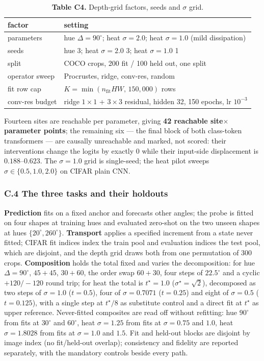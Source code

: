 \begin{table}[t]
\centering
\small
\caption*{\textbf{Table C4.} Depth-grid factors, seeds and $\sigma$ grid.}
\begin{tabularx}{\textwidth}{@{}>{\raggedright\arraybackslash}X >{\raggedright\arraybackslash}X@{}}
\toprule
\textbf{factor} & \textbf{setting} \\
\midrule
parameters & hue $\Delta=90^\circ$; heat $\sigma=2.0$; heat $\sigma=1.0$ (mild dissipation) \\
seeds & hue 3; heat $\sigma=2.0$ 3; heat $\sigma=1.0$ 1 \\
split & 300 COCO crops, 200 fit / 100 held out, one split \\
operator sweep & Procrustes, ridge, conv-res, random \\
fit row cap & $K=\min(n_{\text{fit}}HW,\allowbreak{}\,\allowbreak{}150{,\allowbreak{}}000)$ rows \\
conv-res budget & ridge $1\times1$ + $3\times3$ residual, hidden 32, 150 epochs, lr $10^{-3}$ \\
\bottomrule
\end{tabularx}
\end{table}

Fourteen sites are reachable per parameter, giving \textbf{42 reachable site$\times$parameter points}; the remaining six --- the final block of both class-token transformers --- are causally unreachable and marked, not scored: their interventions change the logits by exactly $0$ while their input-side displacement is $0.188$--$0.623$. The $\sigma=1.0$ grid is single-seed; the heat pilot sweeps $\sigma\in\{0.5,1.0,2.0\}$ on CIFAR plain CNN.

\subsubsection*{C.4 The three tasks and their holdouts}

\textbf{Prediction} fits on a fixed anchor and forecasts other angles; the probe is fitted on four shapes at training hues and evaluated zero-shot on the two unseen shapes at hues $\{20^\circ,260^\circ\}$. \textbf{Transport} applies a specified increment from a state never fitted; CIFAR fit indices index the train pool and evaluation indices the test pool, which are disjoint, and the depth grid draws both from one permutation of 300 crops. \textbf{Composition} holds the total fixed and varies the decomposition: for hue $\Delta=90^\circ$, $45{+}45$, $30{+}60$, the order swap $60{+}30$, four steps of $22.5^\circ$ and a cyclic $+120/-120$ round trip; for heat the total is $t^\star=1.0$ ($\sigma^\star=\sqrt2$), decomposed as two steps of $\sigma=1.0$ ($t=0.5$), four of $\sigma=0.7071$ ($t=0.25$) and eight of $\sigma=0.5$ ($t=0.125$), with a single step at $t^\star/8$ as substitute control and a direct fit at $t^\star$ as upper reference. Never-fitted composites are read off without refitting: hue $90^\circ$ from fits at $30^\circ$ and $60^\circ$, heat $\sigma=1.25$ from fits at $\sigma=0.75$ and $1.0$, heat $\sigma=1.8028$ from fits at $\sigma=1.0$ and $1.5$. Fit and held-out blocks are disjoint by image index (no fit/held-out overlap); consistency and fidelity are reported separately, with the mandatory controls beside every path.

